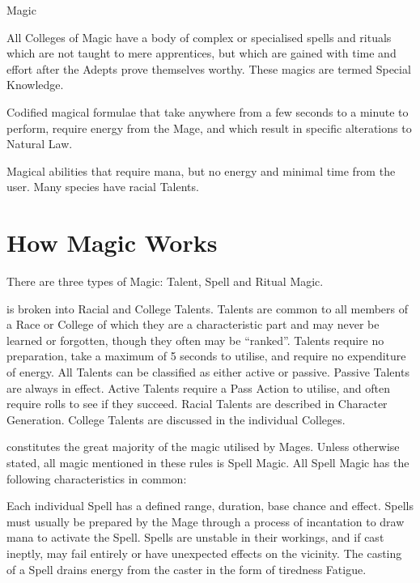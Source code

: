 \begin{Chapter}{Magic}
\begin{Description}
\item[Special Knowledge] All Colleges of Magic have a body of complex
  or specialised spells and rituals which are not taught to mere
  apprentices, but which are gained with time and effort after the
  Adepts prove themselves worthy. These magics are termed Special
  Knowledge.

\item[Spell Magic] Codified magical formulae that take anywhere from a
  few seconds to a minute to perform, require energy from the Mage,
  and which result in specific alterations to Natural Law.

\item[Talent Magic] Magical abilities that require mana, but no energy
  and minimal time from the user.  Many species have racial Talents.

\end{Description}

\section{How Magic Works}
\label{magic:howmagicworks}

There are three types of Magic: Talent, Spell and Ritual Magic.

\begin{Description}
  
\item[Talent Magic] is broken into Racial and College Talents.
  Talents are common to all members of a Race or College of which they
  are a characteristic part and may never be learned or forgotten,
  though they often may be “ranked”.  Talents require no preparation,
  take a maximum of 5 seconds to utilise, and require no expenditure
  of energy.  All Talents can be classified as either active or
  passive.  Passive Talents are always in effect. Active Talents
  require a Pass Action to utilise, and often require rolls to see if
  they succeed.  Racial Talents are described in Character
  Generation. College Talents are discussed in the individual
  Colleges.

\item[Spell Magic] constitutes the great majority of the magic
  utilised by Mages.  Unless otherwise stated, all magic mentioned in
  these rules is Spell Magic.  All Spell Magic has the following
  characteristics in common:

  Each individual Spell has a defined range, duration, base chance and
  effect. Spells must usually be prepared by the Mage through a
  process of incantation to draw mana to activate the Spell.  Spells
  are unstable in their workings, and if cast ineptly, may fail
  entirely or have unexpected effects on the vicinity. The casting of
  a Spell drains energy from the caster in the form of tiredness
  Fatigue.


\end{Description}
\end{Chapter}
